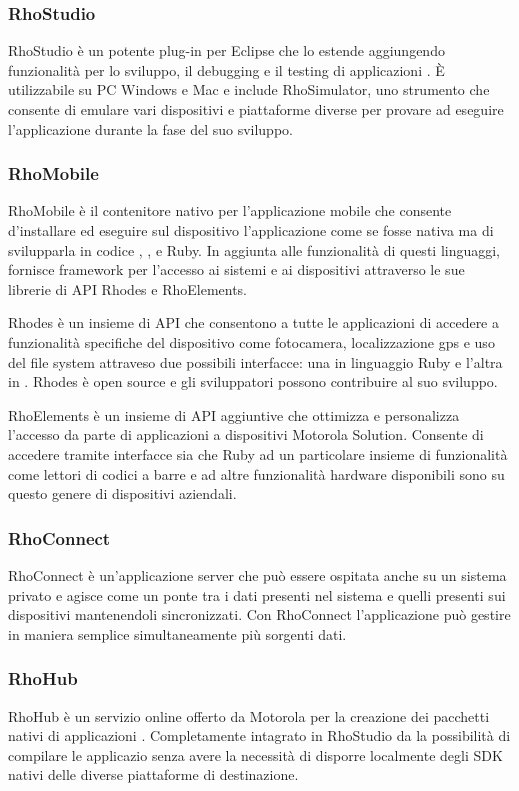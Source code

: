 			\subsubsection{RhoStudio}
				RhoStudio è un potente plug-in per Eclipse che lo estende aggiungendo
				funzionalità per lo sviluppo, il debugging e il testing di
				applicazioni \rhom{}. È utilizzabile su PC Windows e Mac e
				include RhoSimulator, uno strumento che consente di emulare
				vari dispositivi e piattaforme diverse per provare ad eseguire
				l'applicazione durante la fase del suo sviluppo.
			\subsubsection{RhoMobile}
				RhoMobile è il contenitore nativo per l'applicazione mobile che consente
				d'installare ed eseguire sul dispositivo l'applicazione come se
				fosse nativa ma di svilupparla in codice \html{}, \css{}, \js{}
				e Ruby. In aggiunta alle funzionalità di questi linguaggi, \rhom{}
				fornisce framework per l'accesso ai sistemi e ai dispositivi
				attraverso le sue librerie di API Rhodes e RhoElements.
				
				Rhodes è un insieme di API che consentono a tutte le applicazioni
				\rhom{} di accedere a funzionalità specifiche del dispositivo
				come fotocamera, localizzazione gps e uso del file system attraveso
				due possibili interfacce: una in linguaggio Ruby e l'altra in
				\js{}. Rhodes è open source e gli sviluppatori possono
				contribuire al suo sviluppo.
				
				RhoElements è un insieme di API aggiuntive che ottimizza e personalizza
				l'accesso da parte di applicazioni \rhom{} a dispositivi
				Motorola Solution. Consente di accedere tramite interfacce
				sia \js{} che Ruby ad un particolare insieme di funzionalità
				come lettori di codici a barre e ad altre funzionalità
				hardware disponibili sono su questo genere di dispositivi
				aziendali.
			\subsubsection{RhoConnect}
				RhoConnect è un'applicazione server che può essere ospitata anche
				su un sistema privato e agisce come un ponte tra i dati presenti
				nel sistema e quelli presenti sui dispositivi mantenendoli sincronizzati.
				Con RhoConnect l'applicazione può gestire in maniera semplice
				simultaneamente più	sorgenti dati.
			\subsubsection{RhoHub}
				RhoHub è un servizio online offerto da Motorola per la creazione
				dei pacchetti nativi di applicazioni \rhom{}. Completamente intagrato
				in RhoStudio da la possibilità di compilare le applicazio senza
				avere la necessità di disporre localmente degli SDK nativi delle
				diverse piattaforme di destinazione.
